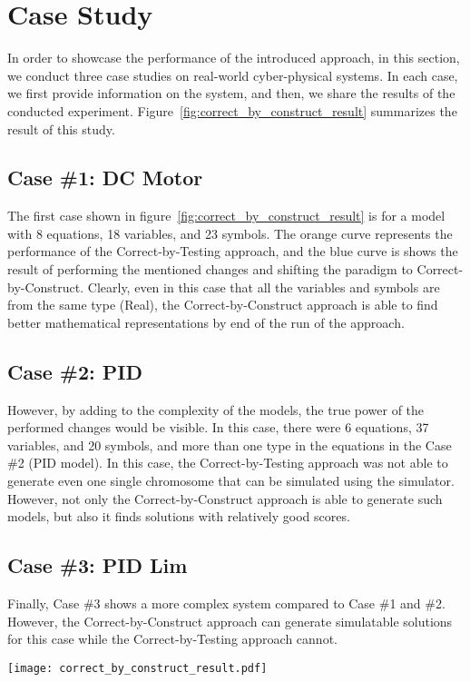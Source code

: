 \section{Case Study}
\label{sec:ExperimentalStudy}
In order to showcase the performance of the introduced approach, in this section, we conduct three case studies on real-world cyber-physical systems. In each case, we first provide information on the system, and then, we share the results of the conducted experiment. Figure~\ref{fig:correct_by_construct_result} summarizes the result of this study.   

\subsection{Case \#1: DC Motor}
The first case shown in figure~\ref{fig:correct_by_construct_result} is for a model with 8 equations, 18 variables, and 23 symbols. The orange curve represents the performance of the Correct-by-Testing approach, and the blue curve is shows the result of performing the mentioned changes and shifting the paradigm to Correct-by-Construct. Clearly, even in this case that all the variables and symbols are from the same type (Real), the Correct-by-Construct approach is able to find better mathematical representations by end of the run of the approach.

\subsection{Case \#2: PID}
However, by adding to the complexity of the models, the true power of the performed changes would be visible. 
In this case, there were 6 equations, 37 variables, and 20 symbols, and more than one type in the equations in the Case \#2 (PID model). In this case, the Correct-by-Testing approach was not able to generate even one single chromosome that can be simulated using the simulator. However, not only the Correct-by-Construct approach is able to generate such models, but also it finds solutions with relatively good scores.


\subsection{Case \#3: PID Lim}
Finally, Case \#3 shows a more complex system compared to Case \#1 and \#2. However, the Correct-by-Construct approach can generate simulatable solutions for this case while the Correct-by-Testing approach cannot. 


\begin{figure*}[ht]
  \centering
  \texttt{[image: correct\_by\_construct\_result.pdf]}
  \caption{The result of changing the synthesis paradigm from Correct-by-Testing to Correct-by-Construct.}
  \label{fig:correct_by_construct_result}
\end{figure*}





